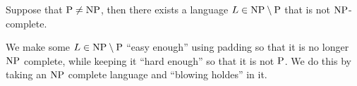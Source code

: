 \begin{note}
  Suppose that $\mathrm{P} \neq \mathrm{NP}$, then there exists a language
  $L \in \mathrm{NP} \setminus \mathrm{P}$ that is not $\mathrm{NP}$-complete.
\end{note}

\begin{note}
  We make some $L \in \mathrm{NP} \setminus \mathrm{P}$ ``easy enough'' using padding so
  that it is no longer $\mathrm{NP}$ complete,
  while keeping it ``hard enough'' so that it is not $\mathrm{P}$.
  We do this by taking an $\mathrm{NP}$ complete language and ``blowing holdes'' in it.
\end{note}
